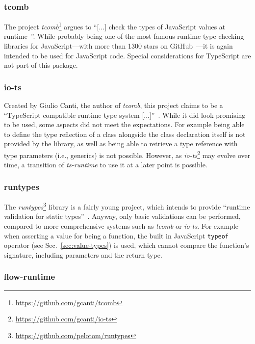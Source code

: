 \subsubsection{tcomb}

The project \emph{tcomb}\footnote{\url{https://github.com/gcanti/tcomb}} argues to ``[...] check the types of JavaScript values at runtime~\cite{RuntimeTypeSystem:tcomb}''. While probably being one of the most famous runtime type checking libraries for JavaScript---with more than 1300 stars on GitHub~\cite{RuntimeTypeSystem:tcomb}---it is again intended to be used for JavaScript code. Special considerations for TypeScript are not part of this package.

\subsubsection{io-ts}

Created by Giulio Canti, the author of \emph{tcomb}, this project claims to be a ``TypeScript compatible runtime type system [...]''~\cite{RuntimeTypeSystem:io-ts}. While it did look promising to be used, some aspects did not meet the expectations. For example being able to define the type reflection of a class alongside the class declaration itself is not provided by the library, as well as being able to retrieve a type reference with type parameters (i.e., generics) is not possible. However, as \emph{io-ts}\footnote{\url{https://github.com/gcanti/io-ts}} may evolve over time, a transition of \emph{ts-runtime} to use it at a later point is possible.

\subsubsection{runtypes}

The \emph{runtypes}\footnote{\url{https://github.com/pelotom/runtypes}} library is a fairly young project, which intends to provide ``runtime validation for static types''~\cite{RuntimeTypeSystem:runtypes}. Anyway, only basic validations can be performed, compared to more comprehensive systems such as \emph{tcomb} or \emph{io-ts}. For example when asserting a value for being a function, the built in JavaScript \texttt{typeof} operator (see Sec.~\ref{sec:value-types}) is used, which cannot compare the function's signature, including parameters and the return type.

\subsubsection{flow-runtime}

